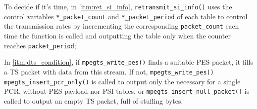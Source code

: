 \documentclass[
	12pt,				%
	openright,			%
	twoside,			%
	a4paper,			%
	brazil,
	french,				%
	english
	]{abntex2}
\begin{document}
To decide if it's time, in \autoref{itm:ret_si_info}, \texttt{retransmit\hspace{0.1mm}\_\hspace{0.1mm}si\hspace{0.1mm}\_\hspace{0.1mm}info()} uses the control variables \texttt{*\hspace{0.1mm}\_\hspace{0.1mm}packet\hspace{0.1mm}\_\hspace{0.1mm}count} and \texttt{*\hspace{0.1mm}\_\hspace{0.1mm}packet\hspace{0.1mm}\_\hspace{0.1mm}period} of each table to control the transmission rates by incrementing the corresponding \texttt{packet\hspace{0.1mm}\_\hspace{0.1mm}count} each time the function is called and outputting the table only when the counter reaches \texttt{packet\hspace{0.1mm}\_\hspace{0.1mm}period};

In \autoref{itm:dts_condition}, if \texttt{mpegts\hspace{0.1mm}\_\hspace{0.1mm}write\hspace{0.1mm}\_\hspace{0.1mm}pes()} finds a suitable PES packet, it fills a TS packet with data from this stream. If not, \texttt{mpegts\hspace{0.1mm}\_\hspace{0.1mm}write\hspace{0.1mm}\_\hspace{0.1mm}pes()} \texttt{mpegts\hspace{0.1mm}\_\hspace{0.1mm}insert\hspace{0.1mm}\_\hspace{0.1mm}pcr\hspace{0.1mm}\_\hspace{0.1mm}only()} is called to output only the necessary for a single PCR, without PES payload nor PSI tables, or \texttt{mpegts\hspace{0.1mm}\_\hspace{0.1mm}insert\hspace{0.1mm}\_\hspace{0.1mm}null\hspace{0.1mm}\_\hspace{0.1mm}packet()} is called to output an empty TS packet, full of stuffing bytes.
\end{document}
